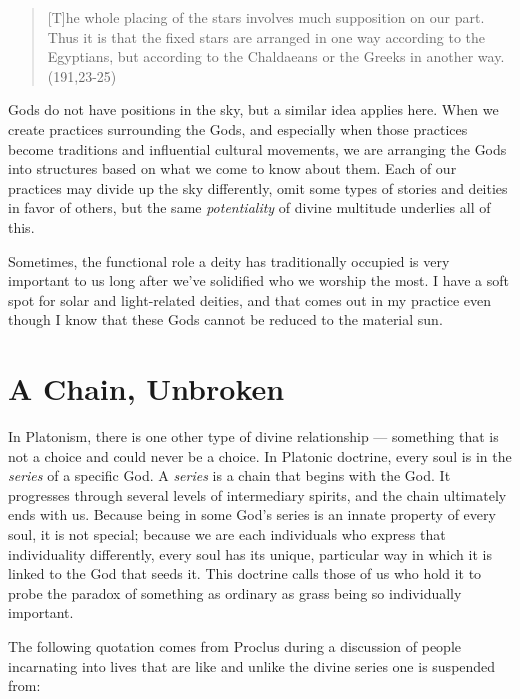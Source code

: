 \documentclass[
]{book}
\begin{document}
\begin{quote}
{[}T{]}he whole placing of the stars involves much supposition on our part. Thus it is that the fixed stars are arranged in one way according to the Egyptians, but according to the Chaldaeans or the Greeks in another way.
(191,23-25)
\end{quote}

Gods do not have positions in the sky, but a similar idea applies here. When we create practices surrounding the Gods, and especially when those practices become traditions and influential cultural movements, we are arranging the Gods into structures based on what we come to know about them. Each of our practices may divide up the sky differently, omit some types of stories and deities in favor of others, but the same \emph{potentiality} of divine multitude underlies all of this.

Sometimes, the functional role a deity has traditionally occupied is very important to us long after we've solidified who we worship the most. I have a soft spot for solar and light-related deities, and that comes out in my practice even though I know that these Gods cannot be reduced to the material sun.

\hypertarget{a-chain-unbroken}{%
\section{A Chain, Unbroken}\label{a-chain-unbroken}}

In Platonism, there is one other type of divine relationship --- something that is not a choice and could never be a choice. In Platonic doctrine, every soul is in the \emph{series} of a specific God. A \emph{series} is a chain that begins with the God. It progresses through several levels of intermediary spirits, and the chain ultimately ends with us. Because being in some God's series is an innate property of every soul, it is not special; because we are each individuals who express that individuality differently, every soul has its unique, particular way in which it is linked to the God that seeds it. This doctrine calls those of us who hold it to probe the paradox of something as ordinary as grass being so individually important.

The following quotation comes from Proclus during a discussion of people incarnating into lives that are like and unlike the divine series one is suspended from:
\end{document}
